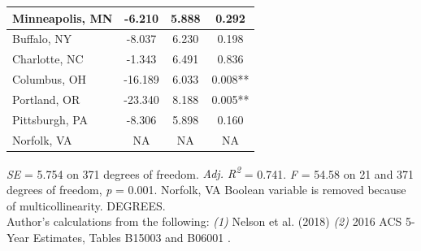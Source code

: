 \documentclass[paper=letter, fontsize=12pt]{scrartcl} %
\begin{document}
\begin{table}
\begin{center}
\begin{tabular}{|| l | c c c ||}
				\hline 
				Minneapolis, MN & -6.210 & 5.888 & 0.292\\ 
				\hline 
				Buffalo, NY & -8.037 & 6.230 & 0.198\\ 
				\hline 
				Charlotte, NC & -1.343 & 6.491 & 0.836\\ 
				\hline 
				Columbus, OH & -16.189 & 6.033 & 0.008**\\ 
				\hline 
				Portland, OR & -23.340 & 8.188 & 0.005**\\ 
				\hline 
				Pittsburgh, PA & -8.306 & 5.898 & 0.160\\ 
				\hline 
				Norfolk, VA & NA & NA & NA\\ 
				\hline 
			\end{tabular}
		\end{center}
		\textit{SE} = 5.754 on 371 degrees of freedom. \textit{Adj. R\textsuperscript{2}} = 0.741. \textit{F} = 54.58 on 21 and 371 degrees of freedom, \textit{p} = 0.001. Norfolk, VA Boolean variable is removed because of multicollinearity. DEGREES.\\
		Author's calculations from the following: \textit{(1)} Nelson et al. (2018) \cite{richmond} \textit{(2)} 2016 ACS 5-Year Estimates, Tables B15003 and B06001 \cite{acs16}.
	\end{table}
	
\end{document}
